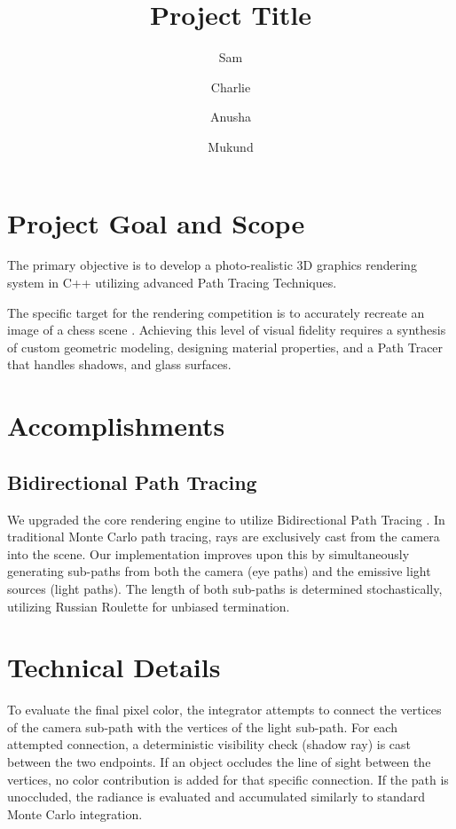 \documentclass[11pt, a4paper]{article}
\title{Project Title}
\author{Sam \and Charlie \and Anusha \and Mukund}
\date{}
\begin{document}
\maketitle

\section*{Project Goal and Scope}

The primary objective is to develop a photo-realistic 3D graphics rendering system in C++ utilizing advanced Path Tracing Techniques. 

The specific target for the rendering competition is to accurately recreate an image of a chess scene \cite{dartmouth_rendering}. Achieving this level of visual fidelity requires a synthesis of custom geometric modeling, designing material properties, and a Path Tracer that handles shadows, and glass surfaces.


\section*{Accomplishments}
\subsection*{Bidirectional Path Tracing }
We upgraded the core rendering engine to utilize Bidirectional Path Tracing \cite{Vlnas2018}. In traditional Monte Carlo path tracing, rays are exclusively cast from the camera into the scene. Our implementation improves upon this by simultaneously generating sub-paths from both the camera (eye paths) and the emissive light sources (light paths). The length of both sub-paths is determined stochastically, utilizing Russian Roulette for unbiased termination.


\section*{Technical Details}

To evaluate the final pixel color, the integrator attempts to connect the vertices of the camera sub-path with the vertices of the light sub-path. For each attempted connection, a deterministic visibility check (shadow ray) is cast between the two endpoints. If an object occludes the line of sight between the vertices, no color contribution is added for that specific connection. If the path is unoccluded, the radiance is evaluated and accumulated similarly to standard Monte Carlo integration. 
\end{document}
